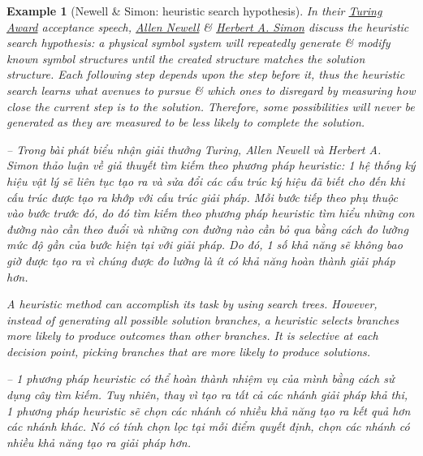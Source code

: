 \documentclass{article}
\newtheorem{example}{Example}
\begin{document}
\begin{example}[{\sc Newell \& Simon}: heuristic search hypothesis]
	In their \href{https://en.wikipedia.org/wiki/Turing_Award}{Turing Award} acceptance speech, \href{https://en.wikipedia.org/wiki/Allen_Newell}{\sc Allen Newell} \& \href{https://en.wikipedia.org/wiki/Herbert_A._Simon}{\sc Herbert A. Simon} discuss the heuristic search hypothesis: a physical symbol system will repeatedly generate \& modify known symbol structures until the created structure matches the solution structure. Each following step depends upon the step before it, thus the heuristic search learns what avenues to pursue \& which ones to disregard by measuring how close the current step is to the solution. Therefore, some possibilities will never be generated as they are measured to be less likely to complete the solution.
	
	-- Trong bài phát biểu nhận giải thưởng Turing, Allen Newell và Herbert A. Simon thảo luận về giả thuyết tìm kiếm theo phương pháp heuristic: 1 hệ thống ký hiệu vật lý sẽ liên tục tạo ra và sửa đổi các cấu trúc ký hiệu đã biết cho đến khi cấu trúc được tạo ra khớp với cấu trúc giải pháp. Mỗi bước tiếp theo phụ thuộc vào bước trước đó, do đó tìm kiếm theo phương pháp heuristic tìm hiểu những con đường nào cần theo đuổi và những con đường nào cần bỏ qua bằng cách đo lường mức độ gần của bước hiện tại với giải pháp. Do đó, 1 số khả năng sẽ không bao giờ được tạo ra vì chúng được đo lường là ít có khả năng hoàn thành giải pháp hơn.
	
	A heuristic method can accomplish its task by using search trees. However, instead of generating all possible solution branches, a heuristic selects branches more likely to produce outcomes than other branches. It is selective at each decision point, picking branches that are more likely to produce solutions.
	
	-- 1 phương pháp heuristic có thể hoàn thành nhiệm vụ của mình bằng cách sử dụng cây tìm kiếm. Tuy nhiên, thay vì tạo ra tất cả các nhánh giải pháp khả thi, 1 phương pháp heuristic sẽ chọn các nhánh có nhiều khả năng tạo ra kết quả hơn các nhánh khác. Nó có tính chọn lọc tại mỗi điểm quyết định, chọn các nhánh có nhiều khả năng tạo ra giải pháp hơn.
\end{example}
\end{document}
